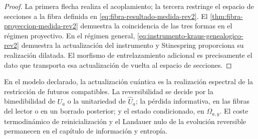 \begin{proof}
La primera flecha realiza el acoplamiento; la tercera restringe el espacio de
secciones a la fibra definida en \eqref{eq:fibra-resultado-medida-rev2}. El
\cref{thm:fibra-proyeccion-medida-rev2} demuestra la coincidencia de las tres
formas en el régimen proyectivo. En el régimen general,
\eqref{eq:instrumento-kraus-genealogico-rev2} demuestra la actualización del
instrumento y Stinespring proporciona su realización dilatada. El morfismo de
entrelazamiento adicional es precisamente el dato que transporta esa
actualización de vuelta al espacio de secciones.
\end{proof}

\begin{statusbox}[title={Resultado y residencia}]
En el modelo declarado, la actualización cuántica es la realización
espectral de la restricción de futuros compatibles. La reversibilidad se
decide por la bimedibilidad de \(U_a\) o la unitariedad de
\(\widehat U_a\); la pérdida informativa, en las fibras del lector o en un
borrado posterior; y el estado condicionado, en \(\Omega_{a,y}\). El coste
termodinámico de reinicialización y el Landauer nulo de la evolución
reversible permanecen en el capítulo de información y entropía.
\end{statusbox}
